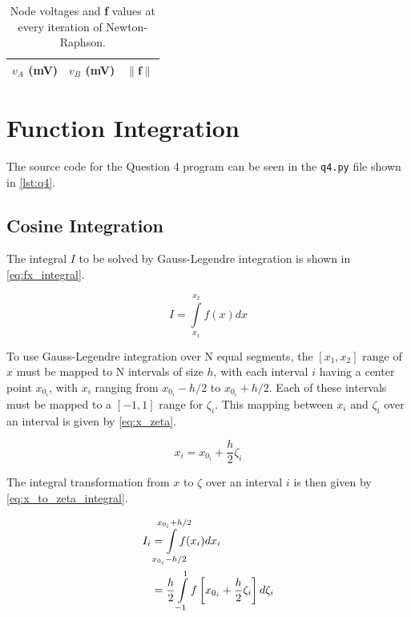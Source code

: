 \documentclass[a4paper,titlepage]{article}
\begin{document}
	
	\begin{table}[!htb]
		\centering
		\caption{Node voltages and \textbf{f} values at every iteration of Newton-Raphson.}
		\begin{tabular}{c | c | c}
			$v_A$ (mV) & $v_B$ (mV) & $\|\textbf{f}\|$ \\ \hline
			
		\end{tabular}
		\label{table:q3}
	\end{table}
	
	\section{Function Integration}
	The source code for the Question 4 program can be seen in the \texttt{q4.py} file shown in \cref{lst:q4}.
	
	\subsection{Cosine Integration}
	
	The integral $I$ to be solved by Gauss-Legendre integration is shown in \cref{eq:fx_integral}.
	
	\begin{equation} \label{eq:fx_integral}
		I = \int\limits_{x_1}^{x_2} f(x) dx 
	\end{equation}
	
	To use Gauss-Legendre integration over N equal segments, the $[x_1, x_2]$ range of $x$ must be mapped to N intervals of size $h$, with each interval $i$ having a center point $x_{0_i}$, with $x_i$ ranging from $x_{0_i} - h/2$ to $x_{0_i} + h/2$. Each of these intervals must be mapped to a $[-1, 1]$ range for $\zeta_i$. This mapping between $x_i$ and $\zeta_i$ over an interval is given by \cref{eq:x_zeta}.
	
	\begin{equation} \label{eq:x_zeta}
		x_i = x_{0_i} + \frac{h}{2} \zeta_i
	\end{equation}
	
	The integral transformation from $x$ to $\zeta$ over an interval $i$ is then given by \cref{eq:x_to_zeta_integral}.
	
	\begin{equation} \label{eq:x_to_zeta_integral}
	\begin{split}
			I_i &= \smashoperator{\int\limits_{x_{0_i} - h/2}^{x_{0_i} + h/2}} f(x_i) dx_i \\
			 &= \frac{h}{2} \int\limits_{-1}^{1} f \left[x_{0_i} + \frac{h}{2} \zeta_i\right] d\zeta_i
	\end{split}
	\end{equation}
	
\end{document}
